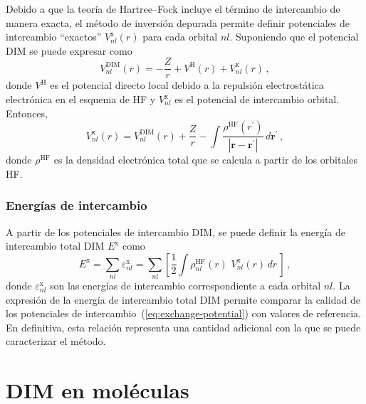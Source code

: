 Debido a que la teoría de Hartree--Fock incluye el término de 
intercambio de manera exacta, el método de inversión depurada permite 
definir potenciales de intercambio ``exactos'' $V_{nl}^{\mathrm{x}}(r)$ 
para cada orbital $nl$. Suponiendo que el potencial DIM se puede 
expresar como
\begin{equation}
V_{nl}^{\mathrm{DIM}}(r) = -\frac{Z}{r} + V^{\mathrm{H}}(r) 
+ V_{nl}^{\mathrm{x}}(r) \, , 
\label{eq:VDIM}
\end{equation}
donde $V^{\mathrm{H}}$ es el potencial directo local debido a la 
repulsión electrostática electrónica en el esquema de HF y 
$V_{nl}^{\mathrm{x}}$ es el potencial de intercambio orbital. Entonces,
\begin{equation}
V_{nl}^{\mathrm{x}}(r)=V_{nl}^{\mathrm{DIM}}(r)+\frac{Z}{r}
-\int{ \frac{\rho^{\mathrm{HF}}(r^{\prime})  }
{\left| \mathbf{r} - \mathbf{r^{\prime}} \right|}} \, 
d \mathbf{r^{\prime}} \, ,
\label{eq:exchange-potential}
\end{equation}
donde $\rho^{\mathrm{HF}}$ es la densidad electrónica total que se
calcula a partir de los orbitales HF.

\subsubsection*{Energías de intercambio}

A partir de los potenciales de intercambio DIM, se puede definir la 
energía de intercambio total DIM $E^{\mathrm{x}}$ como
\begin{equation}
E^{\mathrm{x}} = \sum_{nl}\varepsilon_{nl}^{\mathrm{x}} = 
\sum_{nl}\left[\frac{1}{2}\int{\rho^{\mathrm{HF}}_{nl}(r) \, \, 
V_{nl}^{\mathrm{x}}}(r) \, dr \, \right]\,,
\label{eq:exchange-energy}
\end{equation}
donde $\varepsilon_{nl}^{\mathrm{x}}$ son las energías de intercambio 
correspondiente a cada orbital $nl$. La expresión de la energía de 
intercambio total DIM permite comparar la calidad de los potenciales 
de intercambio~(\ref{eq:exchange-potential}) con valores de referencia. 
En definitiva, esta relación representa una cantidad adicional con la 
que se puede caracterizar el método.

\section{DIM en moléculas}
\label{sec:dimmoleculas}

